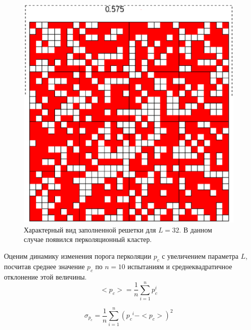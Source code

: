 \documentclass[14pt,a4paper,report]{ncc}
\begin{document}
\begin{figure}[h!]
\begin{center}
\begin{minipage}[h!]{0.49\linewidth}
\includegraphics[width=1\linewidth]{L32_2}
\caption{Характерный вид заполненной решетки для $L=32$. В данном случае появился перколяционный кластер.}
\label{ris:experimcoded}
\end{minipage}
\end{center}
\end{figure}

Оценим динамику изменения порога перколяции $p_c$ с увеличением параметра $L$, посчитав среднее значение $p_c$ по $n=10$ испытаниям и среднеквадратичное отклонение этой величины.
\begin{equation}
<p_c>=\frac{1}{n} \sum\limits_{i=1}^n{p_c^i}
\end{equation}

\begin{equation}
\sigma_{p_c}=\frac{1}{n} \sum\limits_{i=1}^n({{p_c}^i-<p_c>})^2
\end{equation}
\end{document}
